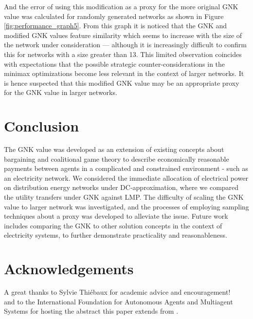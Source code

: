 And the error of using this modification as a proxy for the more original GNK value was calculated for randomly generated networks as shown in Figure \ref{fig:performance_graph5}.
From this graph it is noticed that the GNK and modified GNK values feature similarity which seems to increase with the size of the network under consideration --- although it is increasingly difficult to confirm this for networks with a size greater than 13.
This limited observation coincides with expectations that the possible strategic counter-considerations in the minimax optimizations become less relevant in the context of larger networks.
It is hence suspected that this modified GNK value may be an appropriate proxy for the GNK value in larger networks.

\iffigures

\fi

\section{Conclusion}\label{sec:conclusion}

The GNK value was developed as an extension of existing concepts about bargaining and coalitional game theory to describe economically reasonable payments between agents in a complicated and constrained environment - such as an electricity network.
We considered the immediate allocation of electrical power on distribution energy networks under DC-approximation, where we compared the utility transfers under GNK against LMP. The difficulty of scaling the GNK value to larger network was investigated, and the processes of employing sampling techniques about a proxy was developed to alleviate the issue.
Future work includes comparing the GNK to other solution concepts in the context of electricity systems, to further demonstrate practicality and reasonableness.


\section{Acknowledgements}
A great thanks to Sylvie Thi\'{e}baux for academic advice and encouragement!\\
and to the International Foundation for Autonomous Agents and Multiagent Systems for hosting the abstract this paper extends from \cite{burgess_abstract}.

